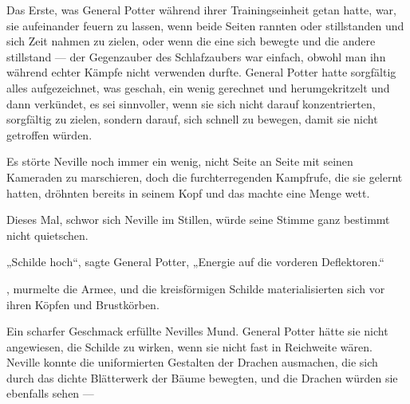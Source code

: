 Das Erste, was General Potter während ihrer Trainingseinheit getan hatte, war, sie aufeinander feuern zu lassen, wenn beide Seiten rannten oder stillstanden und sich Zeit nahmen zu zielen, oder wenn die eine sich bewegte und die andere stillstand — der Gegenzauber des Schlafzaubers war einfach, obwohl man ihn während echter Kämpfe nicht verwenden durfte. General Potter hatte sorgfältig alles aufgezeichnet, was geschah, ein wenig gerechnet und herumgekritzelt und dann verkündet, es sei sinnvoller, wenn sie sich nicht darauf konzentrierten, sorgfältig zu zielen, sondern darauf, sich schnell zu bewegen, damit sie nicht getroffen würden.

Es störte Neville noch immer ein wenig, nicht Seite an Seite mit seinen Kameraden zu marschieren, doch die furchterregenden Kampfrufe, die sie gelernt hatten, dröhnten bereits in seinem Kopf und das machte eine Menge wett.

Dieses Mal, schwor sich Neville im Stillen, würde seine Stimme ganz bestimmt nicht quietschen.

„Schilde hoch“, sagte General Potter,
„Energie auf die vorderen Deflektoren.“

, murmelte die Armee, und die kreisförmigen Schilde materialisierten sich vor ihren Köpfen und Brustkörben.

Ein scharfer Geschmack erfüllte Nevilles Mund. General Potter hätte sie nicht angewiesen, die Schilde zu wirken, wenn sie nicht fast in Reichweite wären. Neville konnte die uniformierten Gestalten der Drachen ausmachen, die sich durch das dichte Blätterwerk der Bäume bewegten, und die Drachen würden sie ebenfalls sehen —

